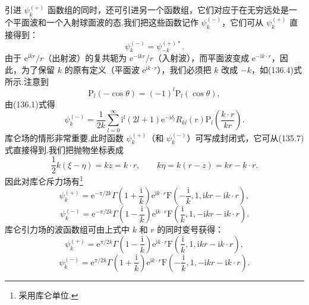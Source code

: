 引进 $\psi_{k}^{(+)}$ 函数组的同时，还可引进另一个函数组，它们对应于在无穷远处是一个平面波和一个入射球面波的态.我们把这些函数记作 $\psi_{k}^{(-)}$，它们可从 $\psi_{k}^{(+)}$ 直接得到：
\begin{equation}
  \psi_{k}^{(-)}=\psi_{-k}^{(+)*}.
\end{equation}
由于 $\mathrm{e}^{\mathrm{i}kr}/r$（出射波）的复共轭为 $\mathrm{e}^{-\mathrm{i}kr}/r$（入射波），而平面波变成 $\mathrm{e}^{-\mathrm{i}k\cdot r}$，因此，为了保留 $k$ 的原有定义（平面波 $\mathrm{e}^{\mathrm{i}k\cdot r}$），我们必须把 $k$ 改成 $-k$，如(136.4)式所示.注意到
\begin{equation*}
  \mathrm{P}_l(-\cos\theta)=(-1)^l\mathrm{P}_l(\cos\theta),
\end{equation*}
由(136.1)式得
\begin{equation}
  \psi_{k}^{(-)}=\frac{1}{2k}\sum_{l=0}^{\infty}\mathrm{i}^{l}(2l+1)
  \mathrm{e}^{-\mathrm{i}\delta_l}R_{kl}(r)
  \mathrm{P}_l\left(\frac{k\cdot r}{kr}\right).
\end{equation}
库仑场的情形非常重要.此时函数 $\psi_{k}^{(+)}$（和 $\psi_{k}^{(-)}$）可写成封闭式，它可从(135.7)式直接得到.我们把抛物坐标表成
\begin{equation*}
  \frac{1}{2}k(\xi-\eta)=kz=k\cdot r,\qquad
  k\eta=k(r-z)=kr-k\cdot r.
\end{equation*}
因此对库仑斥力场有\footnote{采用库仑单位.}
\begin{equation}
  \psi_{k}^{(+)}=\mathrm{e}^{-\pi/2k}
  \Gamma\left(1+\frac{\mathrm{i}}{k}\right)
  \mathrm{e}^{\mathrm{i}k\cdot r}
  \mathrm{F}\left(-\frac{\mathrm{i}}{k},1,
  \mathrm{i}kr-\mathrm{i}k\cdot r\right),
\end{equation}
\begin{equation}
  \psi_{k}^{(-)}=\mathrm{e}^{-\pi/2k}
  \Gamma\left(1-\frac{\mathrm{i}}{k}\right)
  \mathrm{e}^{\mathrm{i}k\cdot r}
  \mathrm{F}\left(\frac{\mathrm{i}}{k},1,
  -\mathrm{i}kr-\mathrm{i}k\cdot r\right).
\end{equation}
库仑引力场的波函数组可由上式中 $k$ 和 $r$ 的同时变号获得：
\begin{equation}
  \psi_{k}^{(+)}=\mathrm{e}^{\pi/2k}
  \Gamma\left(1-\frac{\mathrm{i}}{k}\right)
  \mathrm{e}^{\mathrm{i}k\cdot r}
  \mathrm{F}\left(\frac{\mathrm{i}}{k},1,
  \mathrm{i}kr-\mathrm{i}k\cdot r\right),
\end{equation}
\begin{equation}
  \psi_{k}^{(-)}=\mathrm{e}^{\pi/2k}
  \Gamma\left(1+\frac{\mathrm{i}}{k}\right)
  \mathrm{e}^{\mathrm{i}k\cdot r}
  \mathrm{F}\left(-\frac{\mathrm{i}}{k},1,
  -\mathrm{i}kr-\mathrm{i}k\cdot r\right).
\end{equation}

